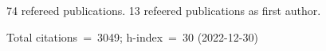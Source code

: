 74 refereed publications. 13 refeered publications as first author.

Total citations~=~3049; h-index~=~30 (2022-12-30)